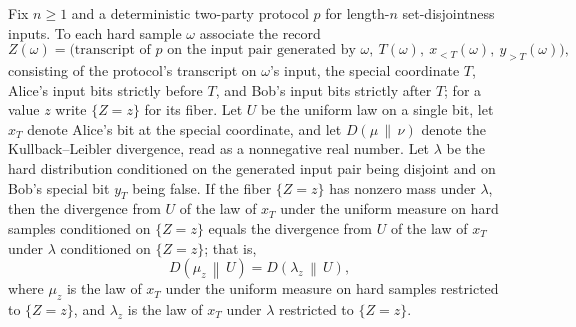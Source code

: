 \begin{theorem}
\label{CommunicationComplexity.Functions.Disjointness.RandomizedLowerBound.xFiberKL_eq_disjointSpecialYFalseMeasure_cond_zVariable_klDiv_of_ne_zero}
\leanok
{}
Fix $n \ge 1$ and a deterministic two-party protocol $p$ for length-$n$ set-disjointness
inputs. To each hard sample $\omega$ associate the record
\[
Z(\omega) = \bigl(\text{transcript of } p \text{ on the input pair generated by }
\omega,\ T(\omega),\ x_{<T}(\omega),\ y_{>T}(\omega)\bigr),
\]
consisting of the protocol's transcript on $\omega$'s input, the special coordinate $T$,
Alice's input bits strictly before $T$, and Bob's input bits strictly after $T$; for a
value $z$ write $\{Z = z\}$ for its fiber. Let $U$ be the uniform law on a single bit,
let $x_T$ denote Alice's bit at the special coordinate, and let $D(\mu\,\|\,\nu)$ denote
the Kullback–Leibler divergence, read as a nonnegative real number. Let $\lambda$ be the
hard distribution conditioned on the generated input pair being disjoint and on Bob's
special bit $y_T$ being false. If the fiber $\{Z = z\}$ has nonzero mass under
$\lambda$, then the divergence from $U$ of the law of $x_T$ under the uniform measure on
hard samples conditioned on $\{Z = z\}$ equals the divergence from $U$ of the law of
$x_T$ under $\lambda$ conditioned on $\{Z = z\}$; that is,
\[
D\!\left(\mu_z \,\middle\|\, U\right) = D\!\left(\lambda_z \,\middle\|\, U\right),
\]
where $\mu_z$ is the law of $x_T$ under the uniform measure on hard samples restricted
to $\{Z = z\}$, and $\lambda_z$ is the law of $x_T$ under $\lambda$ restricted to $\{Z =
z\}$.
\end{theorem}

